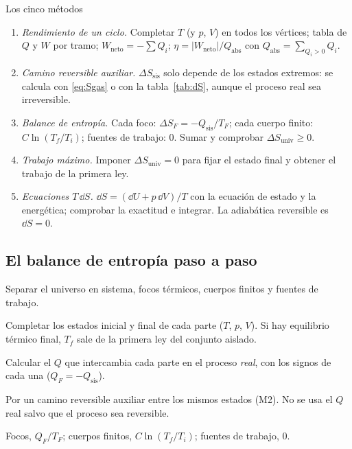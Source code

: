 \begin{recuadro}{Los cinco métodos}
\begin{enumerate}[label=\textbf{\color{navy}M\arabic*.},leftmargin=2.2em,itemsep=4pt]
\item \emph{Rendimiento de un ciclo.} Completar $T$ (y $p$, $V$) en todos los vértices; tabla de $Q$ y $W$ por
  tramo; $W_{\mathrm{neto}}=-\sum Q_i$; $\eta=|W_{\mathrm{neto}}|/Q_{\mathrm{abs}}$ con $Q_{\mathrm{abs}}=\sum_{Q_i>0}Q_i$.
\item \emph{Camino reversible auxiliar.} $\Delta S_{\mathrm{sis}}$ solo depende de los estados extremos: se calcula
  con \eqref{eq:Sgas} o con la tabla~\ref{tab:dS}, aunque el proceso real sea irreversible.
\item \emph{Balance de entropía.} Cada foco: $\Delta S_F=-Q_{\mathrm{sis}}/T_F$; cada cuerpo finito:
  $C\ln(T_f/T_i)$; fuentes de trabajo: 0. Sumar y comprobar $\Delta S_{\mathrm{univ}}\geq0$.
\item \emph{Trabajo máximo.} Imponer $\Delta S_{\mathrm{univ}}=0$ para fijar el estado final y obtener el trabajo
  de la primera ley.
\item \emph{Ecuaciones $T\,\dd S$.} $\dd S=(\dd U+p\,\dd V)/T$ con la ecuación de estado y la energética;
  comprobar la exactitud e integrar. La adiabática reversible es $\dd S=0$.
\end{enumerate}
\end{recuadro}

\subsection{El balance de entropía paso a paso}\label{sec:receta}

 Separar el universo en sistema, focos térmicos, cuerpos finitos y fuentes de trabajo.

 Completar los estados inicial y final de cada parte ($T$, $p$, $V$). Si hay equilibrio
térmico final, $T_f$ sale de la primera ley del conjunto aislado.

 Calcular el $Q$ que intercambia cada parte en el proceso \emph{real}, con los
signos de cada una ($Q_F=-Q_{\mathrm{sis}}$).

 Por un camino reversible auxiliar entre los mismos estados (M2). No se usa el
$Q$ real salvo que el proceso sea reversible.

 Focos, $Q_F/T_F$; cuerpos finitos, $C\ln(T_f/T_i)$; fuentes de trabajo, 0.

